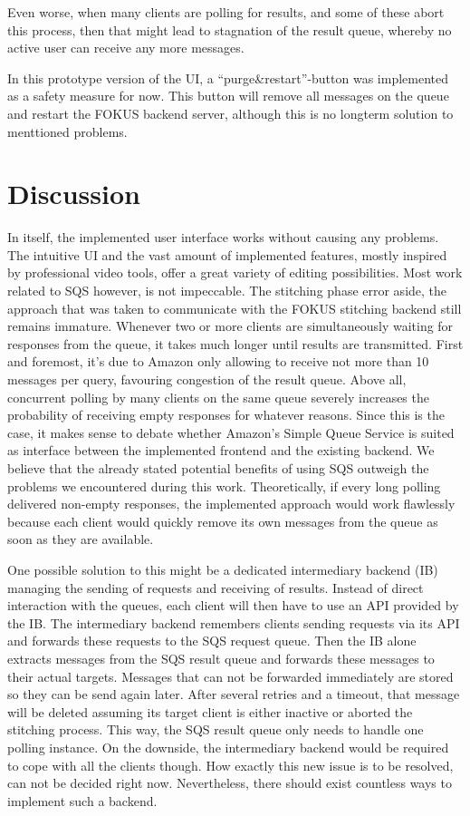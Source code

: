 \documentclass[conference]{IEEEtran}
\begin{document}
Even worse, when many clients are polling for results, and some of these abort this process, then that might lead to stagnation of the result queue, whereby no active user can receive any more messages.

In this prototype version of the UI, a ``purge\&restart''-button was implemented as a safety measure for now.
This button will remove all messages on the queue and restart the FOKUS backend server, although this is no longterm solution to menttioned problems.

\section{Discussion}
In itself, the implemented user interface works without causing any problems.
The intuitive UI and the vast amount of implemented features, mostly inspired by professional video tools, offer a great variety of editing possibilities.
Most work related to SQS however, is not impeccable.
The stitching phase error aside, the approach that was taken to communicate with the FOKUS stitching backend still remains immature.
Whenever two or more clients are simultaneously waiting for responses from the queue, it takes much longer until results are transmitted.
First and foremost, it's due to Amazon only allowing to receive not more than 10 messages per query, favouring congestion of the result queue.
Above all, concurrent polling by many clients on the same queue severely increases the probability of receiving empty responses for whatever reasons.
Since this is the case, it makes sense to debate whether Amazon's Simple Queue Service is suited as interface between the implemented frontend and the existing backend.
We believe that the already stated potential benefits of using SQS outweigh the problems we encountered during this work.
Theoretically, if every long polling delivered non-empty responses, the implemented approach would work flawlessly because each client would quickly remove its own messages from the queue as soon as they are available.

One possible solution to this might be a dedicated intermediary backend (IB) managing the sending of requests and receiving of results.
Instead of direct interaction with the queues, each client will then have to use an API provided by the IB.
The intermediary backend remembers clients sending requests via its API and forwards these requests to the SQS request queue.
Then the IB alone extracts messages from the SQS result queue and forwards these messages to their actual targets.
Messages that can not be forwarded immediately are stored so they can be send again later.
After several retries and a timeout, that message will be deleted assuming its target client is either inactive or aborted the stitching process.
This way, the SQS result queue only needs to handle one polling instance.
On the downside, the intermediary backend would be required to cope with all the clients though.
How exactly this new issue is to be resolved, can not be decided right now.
Nevertheless, there should exist countless ways to implement such a backend.
\end{document}
